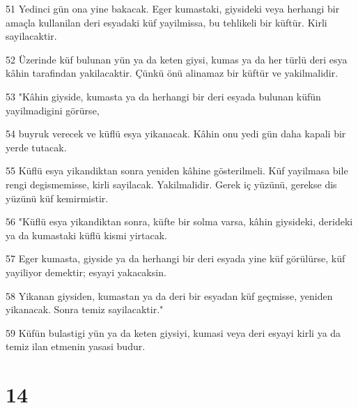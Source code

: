\par 51 Yedinci gün ona yine bakacak. Eger kumastaki, giysideki veya herhangi bir amaçla kullanilan deri esyadaki küf yayilmissa, bu tehlikeli bir küftür. Kirli sayilacaktir.
\par 52 Üzerinde küf bulunan yün ya da keten giysi, kumas ya da her türlü deri esya kâhin tarafindan yakilacaktir. Çünkü önü alinamaz bir küftür ve yakilmalidir.
\par 53 "Kâhin giyside, kumasta ya da herhangi bir deri esyada bulunan küfün yayilmadigini görürse,
\par 54 buyruk verecek ve küflü esya yikanacak. Kâhin onu yedi gün daha kapali bir yerde tutacak.
\par 55 Küflü esya yikandiktan sonra yeniden kâhine gösterilmeli. Küf yayilmasa bile rengi degismemisse, kirli sayilacak. Yakilmalidir. Gerek iç yüzünü, gerekse dis yüzünü küf kemirmistir.
\par 56 "Küflü esya yikandiktan sonra, küfte bir solma varsa, kâhin giysideki, derideki ya da kumastaki küflü kismi yirtacak.
\par 57 Eger kumasta, giyside ya da herhangi bir deri esyada yine küf görülürse, küf yayiliyor demektir; esyayi yakacaksin.
\par 58 Yikanan giysiden, kumastan ya da deri bir esyadan küf geçmisse, yeniden yikanacak. Sonra temiz sayilacaktir."
\par 59 Küfün bulastigi yün ya da keten giysiyi, kumasi veya deri esyayi kirli ya da temiz ilan etmenin yasasi budur.

\chapter{14}

